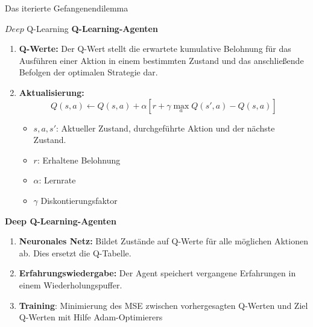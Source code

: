 \documentclass[final]{beamer}
\newlength{\colwidth}
\begin{document}
\begin{frame}[t]
\begin{columns}[t]
\begin{column}{\colwidth}
\begin{block}{Das iterierte Gefangenendilemma}

  \end{block}

  \begin{block}{\(Deep\) Q-Learning}
    \textbf{Q-Learning-Agenten}
    \begin{enumerate}
      \item \textbf{Q-Werte:} Der Q-Wert stellt die erwartete kumulative Belohnung für das Ausführen einer Aktion in einem bestimmten 
      Zustand und das anschließende Befolgen der optimalen Strategie dar.
      \item \textbf{Aktualisierung:} \begin{equation*} Q(s, a)\leftarrow Q(s, a) + \alpha [r + \gamma \max_{a}Q(s', a) - Q(s, a)]
                                      \end{equation*}
            \begin{itemize}
              \item $s,a,s'$: Aktueller Zustand, durchgeführte Aktion und der nächste Zustand.
              \item $r$: Erhaltene Belohnung
              \item $\alpha$: Lernrate 
              \item $\gamma$ Diskontierungsfaktor
            \end{itemize}
  \end{enumerate}

  \textbf{Deep Q-Learning-Agenten}

  \begin{enumerate}
    \item \textbf{Neuronales Netz:} Bildet Zustände auf Q-Werte für alle möglichen Aktionen ab. Dies ersetzt die Q-Tabelle.
    \item \textbf{Erfahrungswiedergabe:} Der Agent speichert vergangene Erfahrungen in einem Wiederholungspuffer.
    \item \textbf{Training}: Minimierung des MSE zwischen vorhergesagten Q-Werten und Ziel Q-Werten mit Hilfe Adam-Optimierers
  \end{enumerate}
  

\end{block}
\end{column}
\end{columns}
\end{frame}
\end{document}
